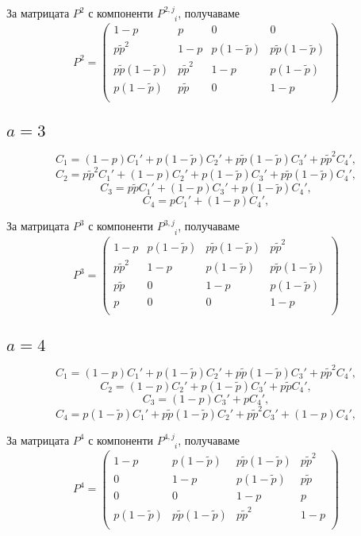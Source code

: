 \documentclass[english,bulgarian,a4paper,10pt]{article}
\begin{document}
За матрицата $P^{2}$ с компоненти $P^{2,j}_{\phantom{2,j}i}$, получаваме
\begin{equation}
 P^{2} = \begin{pmatrix}
          1-p &p &0 &0\\
          p\tilde{p}^2 &1-p &p(1-\tilde{p}) &p\tilde{p}(1-\tilde{p})\\
          p\tilde{p}(1-\tilde{p}) &p\tilde{p}^2 &1-p &p(1-\tilde{p})\\
          p(1-\tilde{p}) &p\tilde{p} &0 &1-p\\
         \end{pmatrix}
\end{equation}

\subsection{$a=3$}
$$C_1 = (1-p) C_1' + p(1-\tilde{p}) C_2' + p\tilde{p}(1-\tilde{p}) C_3' + p\tilde{p}^2 C_4',$$
$$C_2 = p\tilde{p}^2 C_1' + (1-p) C_2' + p(1-\tilde{p}) C_3' + p\tilde{p}(1-\tilde{p}) C_4',$$
$$C_3 = p\tilde{p} C_1' + (1-p) C_3' + p(1-\tilde{p}) C_4',$$
$$C_4 = p C_1' + (1-p) C_4',$$


За матрицата $P^{3}$ с компоненти $P^{3,j}_{\phantom{3,j}i}$, получаваме
\begin{equation}
 P^{3} = \begin{pmatrix}
          1-p &p(1-\tilde{p}) &p\tilde{p}(1-\tilde{p}) &p\tilde{p}^2\\
          p\tilde{p}^2 &1-p &p(1-\tilde{p}) &p\tilde{p}(1-\tilde{p})\\
          p\tilde{p} &0 &1-p &p(1-\tilde{p})\\
          p &0 &0 &1-p\\
         \end{pmatrix}
\end{equation}


\subsection{$a=4$}
$$C_1 = (1-p) C_1' + p(1-\tilde{p}) C_2' + p\tilde{p}(1-\tilde{p}) C_3' + p\tilde{p}^2 C_4',$$
$$C_2 = (1-p) C_2' + p(1-\tilde{p}) C_3' + p\tilde{p} C_4',$$
$$C_3 = (1-p) C_3' + p C_4',$$
$$C_4 = p(1-\tilde{p}) C_1' + p\tilde{p}(1-\tilde{p}) C_2' + p\tilde{p}^2 C_3' + (1-p) C_4',$$

За матрицата $P^{4}$ с компоненти $P^{4,j}_{\phantom{4,j}i}$, получаваме
\begin{equation}
 P^{4} = \begin{pmatrix}
          1-p &p(1-\tilde{p}) &p\tilde{p}(1-\tilde{p}) &p\tilde{p}^2\\
          0 &1-p &p(1-\tilde{p}) &p\tilde{p}\\
          0 &0 &1-p &p\\
          p(1-\tilde{p}) &p\tilde{p}(1-\tilde{p}) &p\tilde{p}^2 &1-p\\
         \end{pmatrix}
\end{equation}
\end{document}
